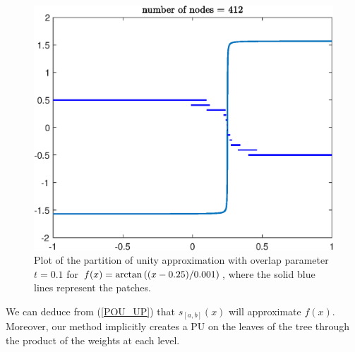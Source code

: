\begin{figure}[!htb]
\centering
\includegraphics[scale = 0.5]{Chapter1/non_merging_example.eps}
\caption{Plot of the partition of unity approximation with overlap parameter $t=0.1$ for $f(x)=\arctan \left( (x-0.25)/0.001 \right)$, where the solid blue lines represent the patches.}
\label{ARCTAN2}
\end{figure}


We can deduce from (\ref{POU_UP}) that $s_{[a,b]}(x)$ will approximate $f(x)$. Moreover, our method implicitly creates a PU on the leaves of the tree through the product of the weights at each level.

